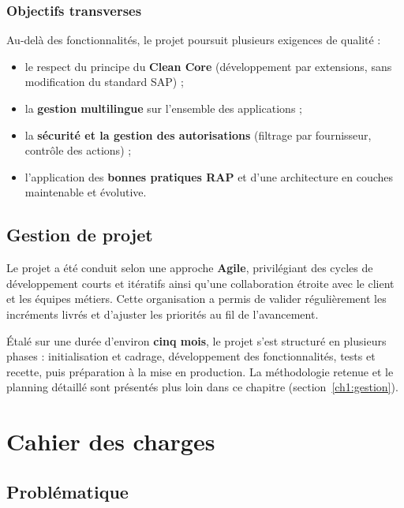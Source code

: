 \documentclass[12pt,a4paper,oneside]{report}
\begin{document}
\subsubsection{Objectifs transverses}\label{ch1:obj-transverses}

Au-delà des fonctionnalités, le projet poursuit plusieurs exigences de qualité :

\begin{itemize}[label=---, itemsep=0.2em]
	\item le respect du principe du \textbf{Clean Core} (développement par extensions,
	      sans modification du standard SAP) ;
	\item la \textbf{gestion multilingue} 	sur l'ensemble des
	      applications ;
	\item la \textbf{sécurité et la gestion des autorisations} (filtrage par
	      fournisseur, contrôle des actions) ;
	\item l'application des \textbf{bonnes pratiques RAP} et d'une architecture en
	      couches maintenable et évolutive.
\end{itemize}
\setcounter{secnumdepth}{2}

\subsection{Gestion de projet}\label{ch1:gestion-projet}

Le projet a été conduit selon une approche \textbf{Agile}, privilégiant des cycles de
développement courts et itératifs ainsi qu'une collaboration étroite avec le client et
les équipes métiers. Cette organisation a permis de valider régulièrement les
incréments livrés et d'ajuster les priorités au fil de l'avancement.

Étalé sur une durée d'environ \textbf{cinq mois}, le projet s'est structuré en plusieurs
phases : initialisation et cadrage, développement des fonctionnalités, tests et recette,
puis préparation à la mise en production. La méthodologie retenue et le planning détaillé
sont présentés plus loin dans ce chapitre (section~\ref{ch1:gestion}).

\clearpage
\section{Cahier des charges}\label{ch1:cahier}

\subsection{Probl\'ematique}\label{ch1:problematique}
\end{document}
